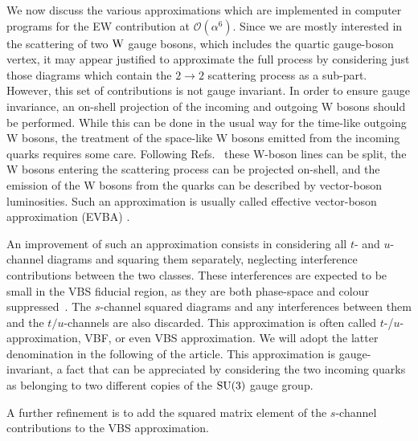 We now discuss the various approximations which are implemented in computer programs for the EW contribution at $\mathcal{O}{\left(\alpha^{6}\right)}$.
Since we are mostly interested in 
the scattering of two $\text{W}$ gauge bosons, which includes the quartic gauge-boson vertex, it may appear justified to approximate the 
full process by considering just those diagrams which contain the $2\rightarrow 2$ scattering process as a sub-part.
However, this set of contributions is not gauge invariant.
In order to ensure gauge invariance, an on-shell projection of
the incoming and outgoing W bosons should be performed.
While this can be done in the usual way for the time-like
outgoing W bosons, the treatment of the space-like W bosons
emitted from the incoming quarks requires some care.
Following Refs.~\cite{Kuss:1995yv,Accomando:2006hq} these W-boson lines can be split,
the W bosons entering the scattering process can be projected
on-shell, and the emission of the W bosons from the quarks can be
described by vector-boson luminosities.
Such an approximation is usually called effective vector-boson
approximation (EVBA) \cite{Dawson:1984gx,Duncan:1985vj,Cahn:1983ip}.

An improvement of such an approximation consists 
in considering all $t$- and $u$-channel diagrams and squaring them separately, neglecting interference contributions between the two classes.
These interferences are expected to be small in the VBS fiducial region, as they are both phase-space and colour suppressed~\cite{Oleari:2003tc,Denner:2012dz}.
The $s$-channel squared diagrams and any interferences between them and the  $t/u$-channels are also discarded.
This approximation is often called $t$-/$u$- approximation, VBF, or even VBS approximation.
We will adopt the latter denomination in the following of the article.
This approximation is gauge-invariant, a fact that can be appreciated by considering the two incoming quarks as belonging to two different copies of the $\rm{SU}(3)$ gauge group.

A further refinement is to add the squared matrix element of the $s$-channel contributions to the VBS approximation.

